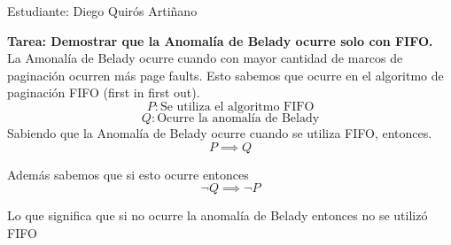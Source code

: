 \documentclass[10pt, article, natbib]{IEEEtran}
\begin{document}
Estudiante: Diego Quirós Artiñano

\textbf{Tarea: Demostrar que la Anomalía de Belady ocurre solo con FIFO.} \\

La Amonalía de Belady ocurre cuando con mayor cantidad de marcos de paginación ocurren más page faults. Esto sabemos que ocurre en el algoritmo de paginación FIFO (first in first out).\\

\[ P: \text{Se utiliza el algoritmo FIFO}\]
\[Q: \text{Ocurre la anomalía de Belady} \]
Sabiendo que la Anomalía de Belady ocurre cuando se utiliza FIFO, entonces.
\[P \implies Q\]

Además sabemos que si esto ocurre entonces
\[\neg Q \implies \neg P\]

Lo que significa que si no ocurre la anomalía de Belady entonces no se utilizó FIFO
\end{document}
